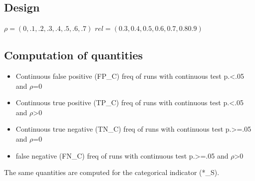 \documentclass{article}
\begin{document}
\subsection*{Design}
\(\rho=(0,.1,.2,.3,.4,.5,.6,.7) \)
\(rel=(0.3, 0.4 ,0.5, 0.6, 0.7 ,0.8 0.9) \) 


\subsection*{Computation of quantities}

\begin{itemize}
  \item Continuous false positive (FP\_C)  freq of runs with continuous test p.<.05 and \(\rho\)=0  
  \item Continuous true positive (TP\_C)  freq of runs with continuous test p.<.05 and \(\rho\)>0
  \item Continuous true negative (TN\_C)  freq of runs  with continuous test p.>=.05 and \(\rho\)=0
  \item false negative (FN\_C)  freq of runs  with continuous test p.>=.05 and \(\rho\)>0
\end{itemize}

The same quantities are computed for the categorical indicator (*\_S).
\end{document}
